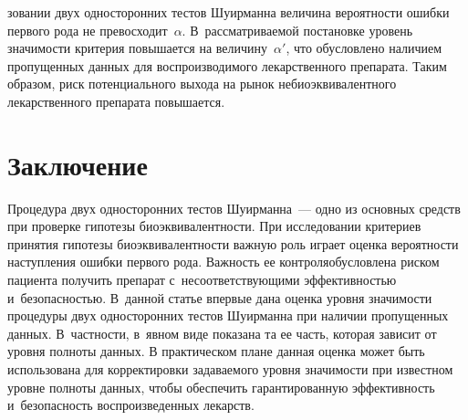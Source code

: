 \begin{multicols}{2}
 \columnbreak
 
 \noindent
зо\-вании двух односторонних тестов Шуирманна\linebreak
  величина 
 вероятности ошибки первого рода не превосходит~$\alpha$. 
 В~рассматриваемой постановке уровень значимости критерия повышается на 
 величину~$\alpha'$, что обусловлено наличием пропущенных данных для 
 воспроизводимого лекарственного препарата. Таким образом, риск потенциального 
 выхода на рынок небиоэквивалентного лекарственного препарата повышается.
 
 \vspace*{-15pt}

\section{Заключение}

 \vspace*{-5pt}

Процедура двух односторонних тестов Шуирманна~--- одно из основных средств 
при проверке гипотезы биоэквивалентности. При исследовании критериев принятия 
гипотезы биоэквивалентности важную роль играет оценка вероятности наступления 
ошибки первого рода. Важность ее контроля\linebreak обусловлена риском пациента получить 
препарат с~несоответствующими эффективностью и~без\-опас\-ностью.
%
В~данной статье впервые дана оценка уровня значимости процедуры двух односторонних
 тестов Шуирманна при наличии пропущенных данных. В~част\-ности, в~явном виде
  показана та ее часть, которая зависит от уровня полноты данных.
%
В практическом плане данная оценка может быть использована для корректировки 
задаваемого уровня зна\-чи\-мости при известном уровне полноты данных, чтобы 
обеспечить гарантированную эффективность и~безопасность воспроизведенных лекарств.

 \vspace*{-15pt}


{\small\frenchspacing
 { %
 \begin{thebibliography}{9}
 
  \vspace*{-5pt}
  

\end{thebibliography}}}
\end{multicols}
